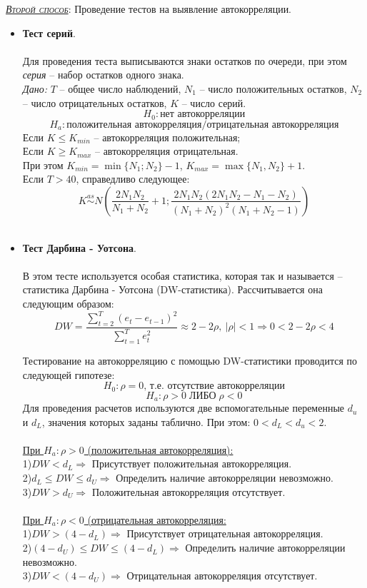 \documentclass[a0,final]{a0poster}
\begin{document}
\begin{multicols}{4}
\underline{\textsc{\textit{Второй способ}}}: Проведение тестов на выявление автокорреляции. \\
\begin{itemize}
\item \textbf{Тест серий}. \\
\\
Для проведения теста выписываются знаки остатков по очереди, при этом \textit{серия} -- набор остатков одного знака. \\
\textit{Дано:} $T$ -- общее число наблюдений, $N_1$ -- число положительных остатков, $N_2$ -- число отрицательных остатков, $K$ -- число серий.
$$H_0: \text{нет автокорреляции}$$
$$H_a: \text{положительная автокорреляция/отрицательная автокорреляция}$$
Если $K \le K_{min}$ -- автокорреляция положительная; \\
Если $K \ge K_{max}$ -- автокорреляция отрицательная. \\
При этом $K_{min} = \min\{N_1;N_2\}-1$, $K_{max} = \max\{N_1,N_2\}+1$.\\
Если $T>40$, справедливо следующее:
$$K\overset{as}{{\sim}}N(\frac{2N_1N_2}{N_1+N_2}+1;\frac{2N_1N_2(2N_1N_2-N_1-N_2)}{(N_1+N_2)^2(N_1+N_2-1)})$$
\\
\item \textbf{Тест Дарбина - Уотсона}. \\
\\
В этом тесте используется особая статистика, которая так и называется -- статистика Дарбина - Уотсона (DW-статистика). Рассчитывается она следующим образом:
$$DW=\frac{\sum\limits_{t=2}^T(e_t-e_{t-1})^2}{\sum\limits_{t=1}^T e_t^2}\approx2-2\rho,\:|\rho|<1\Rightarrow0< 2-2\rho<4$$
\columnbreak

Тестирование на автокорреляцию с помощью DW-статистики проводится по следующей гипотезе:
$$H_0: \rho=0 \text{, т.е. отсутствие автокорреляции}$$
$$H_a: \rho>0 \; \text{ЛИБО}\;\rho<0$$
Для проведения расчетов используются две вспомогательные переменные $d_u$ и $d_L$, значения которых заданы таблично. При этом: $0<d_L<d_u<2$. \\
\\
\underline{При $H_a: \rho>0$ (положительная автокорреляция):} \\
1)$DW<d_L\Rightarrow$ Присутствует положительная автокорреляция. \\
2)$d_L \le DW \le d_U \Rightarrow$ Определить наличие автокорреляции невозможно. \\
3)$DW>d_U  \Rightarrow$ Положительная автокорреляция отсутствует. \\
\\
\underline{При $H_a: \rho<0$ (отрицательная автокорреляция:} \\
1)$DW>(4-d_L)\Rightarrow$ Присутствует отрицательная автокорреляция. \\
2)$(4-d_U)\leq DW\leq (4-d_L)\Rightarrow$ Определить наличие автокорреляции невозможно.\\
3)$DW<(4-d_U)\Rightarrow$ Отрицательная автокорреляция отсутствует. \\


\end{itemize}
\end{multicols}
\end{document}
